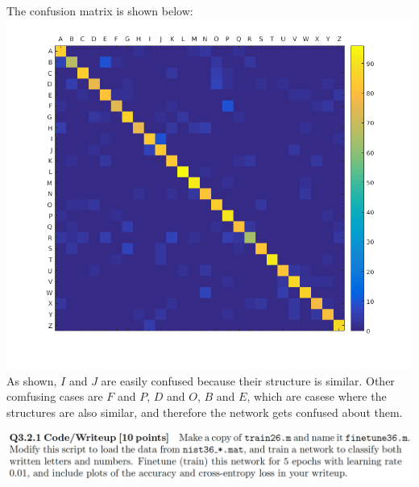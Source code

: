 \documentclass[12pt,letterpaper,boxed]{hmcpset}
\begin{document}
\begin{solution}
The confusion matrix is shown below:\\
\includegraphics[width=\textwidth]{3_1_4_1.png}\\
As shown, $I$ and $J$ are easily confused because their structure is similar. Other comfusing cases are $F$ and $P$,
$D$ and $O$, $B$ and $E$, which are casese where the structures are also similar, and therefore the network gets 
confused about them.
\end{solution}
\newpage

\begin{problem}[]
\includegraphics[width=\textwidth]{3_2_1.png}
\end{problem}
\end{document}
